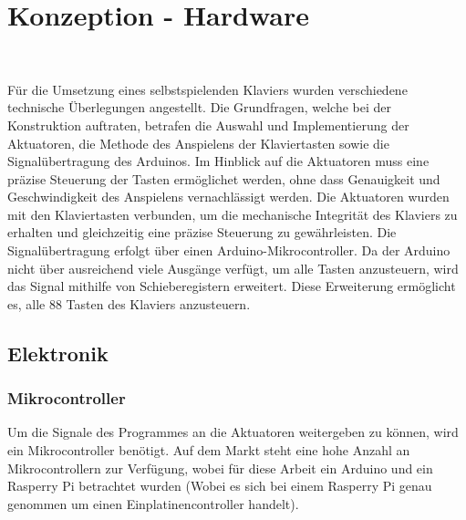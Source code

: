 
\graphicspath{ {./img/} }

\chapter{Konzeption - Hardware}\label{Hardware - Konzeption}~\nocite{*}

Für die Umsetzung eines selbstspielenden Klaviers wurden verschiedene technische Überlegungen angestellt.
Die Grundfragen, welche bei der Konstruktion auftraten, betrafen die Auswahl und Implementierung der
Aktuatoren, die Methode des Anspielens der Klaviertasten sowie die Signalübertragung des Arduinos.
Im Hinblick auf die Aktuatoren muss eine präzise Steuerung der Tasten
ermöglichet werden, ohne dass Genauigkeit und Geschwindigkeit des Anspielens vernachlässigt werden.
\newline
Die Aktuatoren wurden mit den Klaviertasten verbunden, um die mechanische Integrität des Klaviers
zu erhalten und gleichzeitig eine präzise Steuerung zu gewährleisten.\newline
Die Signalübertragung erfolgt über einen Arduino-Mikrocontroller. Da der Arduino nicht über ausreichend
viele Ausgänge verfügt, um alle Tasten anzusteuern, wird das Signal mithilfe von Schieberegistern erweitert.
Diese Erweiterung ermöglicht es, alle 88 Tasten des Klaviers anzusteuern.

\section{Elektronik}\label{Vorgehen - Hardware}


\subsection{Mikrocontroller}\label{Ansteuerung}
Um die Signale des Programmes an die Aktuatoren weitergeben zu können, wird ein Mikrocontroller benötigt.
Auf dem Markt steht eine hohe Anzahl an Mikrocontrollern zur Verfügung, wobei für diese Arbeit ein Arduino und ein
Rasperry Pi betrachtet wurden (Wobei es sich bei einem Rasperry Pi genau genommen um einen Einplatinencontroller
handelt). \newline

